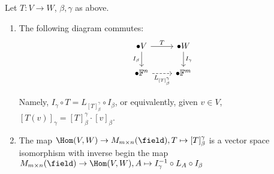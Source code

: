 \begin{theorem}
    Let $T: V \to W$, $\beta, \gamma$ as above. \begin{enumerate}
        \item The following diagram commutes:
        \[
        \begin{tikzcd}
            {\bullet V} & {\bullet W} \\
            {\bullet \mathbb{F}^n} & {\bullet \mathbb{F}^m}
            \arrow[from=1-1, to=1-2, "T"]
             \arrow["{I_\beta}"', from=1-1, to=2-1]
            \arrow["{I_\gamma}", from=1-2, to=2-2]
            \arrow["{L_{[T]_\beta^\gamma}}"', from=2-1, to=2-2, dashed]
        \end{tikzcd}
        \]
        

        Namely, $I_\gamma \circ T = L_{[T]_\beta^\gamma} \circ I_\beta$, or equivalently, given $v \in V$, $[T(v)]_\gamma = [T]_\beta^\gamma \cdot [v]_\beta$.
        \item The map $\Hom(V, W) \to M_{m\times n}(\field), T \mapsto [T]_\beta^\gamma$ is a vector space isomorphism with inverse begin the map $M_{m \times n}(\field) \to \Hom(V, W), A \mapsto I_\gamma^{-1}\circ L_A \circ I_\beta$
    \end{enumerate}
\end{theorem}

